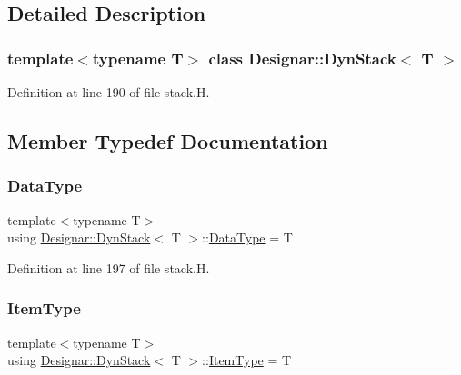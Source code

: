 \subsection{Detailed Description}
\subsubsection*{template$<$typename T$>$\newline
class Designar\+::\+Dyn\+Stack$<$ T $>$}



Definition at line 190 of file stack.\+H.



\subsection{Member Typedef Documentation}
\mbox{\label{class_designar_1_1_dyn_stack_afb7dc9ebd5c844450d997e38b195f3bb}} 
\subsubsection{\texorpdfstring{Data\+Type}{DataType}}
{\footnotesize\ttfamily template$<$typename T$>$ \\
using \hyperlink{class_designar_1_1_dyn_stack}{Designar\+::\+Dyn\+Stack}$<$ T $>$\+::\hyperlink{class_designar_1_1_fixed_array_a3e37931b909b840cb7a40fc73f12bcf5}{Data\+Type} =  T}



Definition at line 197 of file stack.\+H.

\mbox{\label{class_designar_1_1_dyn_stack_a2e50015faeef3234802046097db79f73}} 
\subsubsection{\texorpdfstring{Item\+Type}{ItemType}}
{\footnotesize\ttfamily template$<$typename T$>$ \\
using \hyperlink{class_designar_1_1_dyn_stack}{Designar\+::\+Dyn\+Stack}$<$ T $>$\+::\hyperlink{class_designar_1_1_fixed_array_abfeb4e683cee75ae782ad20294c4c808}{Item\+Type} =  T}



